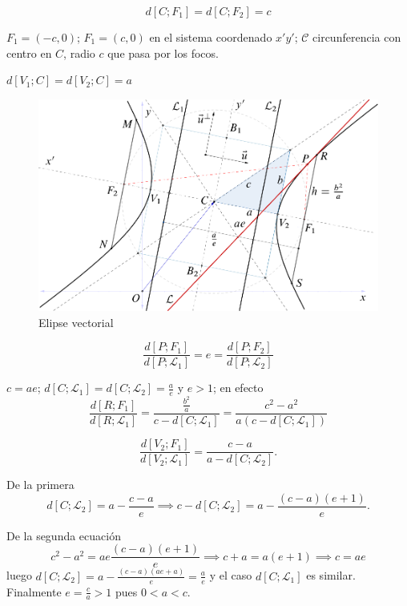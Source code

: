 \documentclass[12pt,]{report}
\theoremstyle{definition}
\theoremstyle{definition}
\theoremstyle{definition}
\theoremstyle{remark}
\begin{document}
\[d\left[C;F_1\right]=d\left[C;F_2\right]=c\]

\(F_1=(-c,0)\); \(F_1=(c,0)\) en el sistema coordenado \(x'y'\); \(\mathcal{C}\) circunferencia con centro en \(C\), radio \(c\) que pasa por los focos.

\(d\left[V_1;C\right]=d\left[V_2;C\right]=a\)

\begin{figure}

{\centering \includegraphics{hiperbola} 

}

\caption{Elipse vectorial}\label{fig:hiperbola}
\end{figure}

\[\frac{d\left[P;F_1\right]}{d\left[P;\mathcal{L}_1\right]}=e=\frac{d\left[P;F_2\right]}{d\left[P;\mathcal{L}_2\right]}\]

\(c=ae\); \(d\left[C;\mathcal{L}_1\right]=d\left[C;\mathcal{L}_2\right]=\frac{a}{e}\) y \(e>1\); en efecto \[\frac{d\left[R;F_1\right]}{d\left[R;\mathcal{L}_1\right]}=\frac{\frac{b^2}{a}}{c-d\left[C;\mathcal{L}_1\right]}=\frac{c^2-a^2}{a(c-d\left[C;\mathcal{L}_1\right])}\]

\[\frac{d\left[V_2;F_1\right]}{d\left[V_2;\mathcal{L}_1\right]}=\frac{c-a}{a-d\left[C;\mathcal{L}_2\right]}.\]

De la primera \[d\left[C;\mathcal{L}_2\right]=a-\frac{c-a}{e}\implies c-d\left[C;\mathcal{L}_2\right]=a-\frac{(c-a)(e+1)}{e}.\]

De la segunda ecuación \[c^2-a^2=ae\frac{(c-a)(e+1)}{e}\implies c+a=a(e+1)\implies c=ae\] luego \(d\left[C;\mathcal{L}_2\right]=a-\frac{(c-a)(ae+a)}{e}=\frac{a}{e}\) y el caso \(d\left[C;\mathcal{L}_1\right]\) es similar. Finalmente \(e=\frac{c}{a}>1\) pues \(0<a<c.\)
\end{document}
